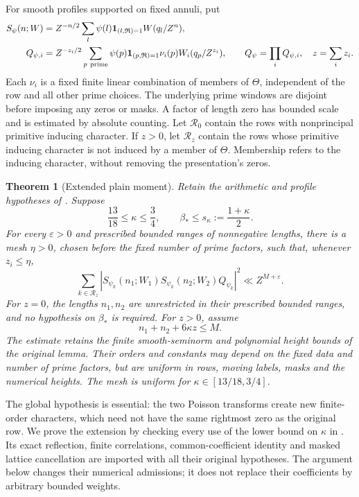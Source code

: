 \documentclass[11pt]{article}
\newtheorem{theorem}{Theorem}[section]
\theoremstyle{remark}
\newcommand{\one}{\mathbf1}
\begin{document}
For smooth profiles supported on fixed annuli, put
\begin{align}
 S_\psi(n;W)&=Z^{-n/2}\sum_l\psi(l)\one_{(l,\mathfrak R)=1}
                                      W(q_l/Z^n),\label{adp:plain-def}\\
 Q_{\psi,i}&=Z^{-z_i/2}\sum_{p\ {\rm prime}}
       \psi(p)\one_{(p,\mathfrak R)=1}\nu_i(p)W_i(q_p/Z^{z_i}),
       \qquad
 Q_\psi=\prod_iQ_{\psi,i},\quad z=\sum_i z_i.\label{adp:slot-def}
\end{align}
Each $\nu_i$ is a fixed finite linear combination of members of
$\Theta$, independent of the row and all other prime choices.
The underlying prime windows are disjoint before imposing any zeros
or masks. A factor of length zero has bounded scale and is estimated
by absolute counting.
Let $\mathcal R_0$ contain the rows with nonprincipal primitive
inducing character. If $z>0$, let $\mathcal R_z$ contain the rows
whose primitive inducing character is not induced by a member of
$\Theta$. Membership refers to the inducing character, without
removing the presentation's zeros.

\begin{theorem}[Extended plain moment]\label{adp:plain}
Retain the arithmetic and profile hypotheses of
\cite[Lemma 18.1]{OAI26}. Suppose
\[
 \frac{13}{18}\le\kappa\le\frac34,\qquad
 \beta_*\le s_\kappa:=\frac{1+\kappa}{2}.
\]
For every $\varepsilon>0$ and prescribed bounded ranges of nonnegative
lengths, there is a mesh $\eta>0$, chosen before the fixed number of
prime factors, such that, whenever $z_i\le\eta$,
\begin{equation}\label{adp:moment}
 \sum_{k\in\mathcal R_z}
 \left|S_{\psi_k}(n_1;W_1)S_{\psi_k}(n_2;W_2)Q_{\psi_k}\right|^2
 \ll Z^{M+\varepsilon}.
\end{equation}
For $z=0$, the lengths $n_1,n_2$ are unrestricted in their prescribed
bounded ranges, and no hypothesis on $\beta_*$ is required.
For $z>0$, assume
\begin{equation}\label{adp:admission}
 n_1+n_2+6\kappa z\le M .
\end{equation}
The estimate retains the finite smooth-seminorm and polynomial
height bounds of the original lemma. Their orders and constants
may depend on the fixed data and number of prime factors, but are
uniform in rows, moving labels, masks and the numerical heights.
The mesh is uniform for $\kappa\in[13/18,3/4]$.
\end{theorem}

The global hypothesis is essential: the two Poisson transforms create
new finite-order characters, which need not have the same rightmost
zero as the original row. We prove the extension by checking every
use of the lower bound on $\kappa$ in \cite[Section 18]{OAI26}.
Its exact reflection, finite correlations, common-coefficient identity
and masked lattice cancellation are imported with all their original
hypotheses. The argument below changes their numerical admissions;
it does not replace their coefficients by arbitrary bounded weights.
\end{document}
